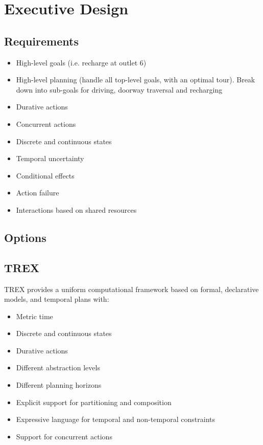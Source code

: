 \documentclass[letterpaper]{article}
\begin{document}
\section{Executive Design}

\subsection{Requirements}
\begin{itemize}
\item High-level goals (i.e. recharge at outlet 6)
\item High-level planning (handle all top-level goals, with an optimal tour). Break down into sub-goals for driving, doorway traversal and recharging
\item Durative actions
\item Concurrent actions
\item Discrete and continuous states
\item Temporal uncertainty
\item Conditional effects
\item Action failure
\item Interactions based on shared resources
\end{itemize}

\subsection{Options}

\subsection{TREX}
TREX provides a uniform computational framework based on formal, declarative models, and temporal plans with:
\begin{itemize}
\item Metric time
\item Discrete and continuous states
\item Durative actions
\item Different abstraction levels
\item Different planning horizons
\item Explicit support for partitioning and composition
\item Expressive language for temporal and non-temporal constraints
\item Support for concurrent actions
\end{itemize}
\end{document}
